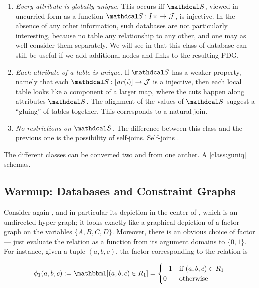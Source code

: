 \documentclass{article}
\theoremstyle{definition}
\theoremstyle{remark}
\newcommand{\Attrs}{\mathcal J}
\newcommand{\arity}{\mathit{ar}}
\newcommand{\sch}{\mathdcal S}%
\begin{document}
\begin{enumerate}[nosep, label={\textbf{Class \arabic*:}},ref={class \arabic*}]

	\item %
		\textit{Every attribute is globally unique.}
		This occurs iff $\sch$, viewed in uncurried form as a function $\sch : I \times \to \Attrs$, is injective. 
		In the absence of any other information, such databases are not particularly interesting, because no table any relationship to any other, and one may as well consider them separately. We will see in  that this class of database can still be useful if we add additional nodes and links to the resulting PDG.
		\label{class:guniq}
				
	\item %
		\textit{Each attribute of a table is unique.}
		If $\sch$ has a weaker property, namely that each $\sch : [\arity(i)] \to \Attrs$ is a injective, then each local table looks like a component of a larger map, where the cuts happen along attributes $\sch$. The alignment of the values of $\sch$ suggest a ``gluing'' of tables together. This corresponds to a natural join. 
		\label{class:luniq}
	\item \textit{No restrictions on $\sch$.} The difference between this class and the previous one is the possibility of self-joins. Self-joins \cite{DS04}.
		\label{class:nuniq}
\end{enumerate}

	The different classes can be converted two and from one anther. A \ref{class:guniq} schemas.
	
\subsection{Warmup: Databases and Constraint Graphs}

Consider again , and in particular its depiction in the center of , which is an undirected hyper-graph; it looks exactly like a graphical depiction of a factor graph on the variables $\{A,B,C,D\}$. Moreover, there is an obvious choice of factor --- just evaluate the relation as a function from its argument domains to $\{0,1\}$. For instance, given a tuple $(a,b,c)$, the factor corresponding to the relation is
 
\[ \phi_1( a,b,c) := \mathbbm1[(a,b,c) \in R_1]=  \begin{cases}
	+1 & \text{if } (a,b,c) \in R_1 \\ 0 & \text{otherwise}
\end{cases}
\]
 
\end{document}
